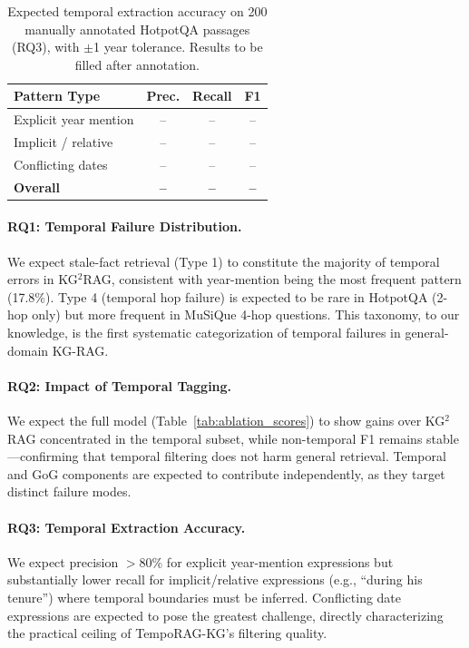 \documentclass[11pt]{article}
\begin{document}
\begin{table}[t]
  \centering
  \small
  \begin{tabular}{lccc}
    \toprule
    \textbf{Pattern Type} & \textbf{Prec.} & \textbf{Recall} & \textbf{F1} \\
    \midrule
    Explicit year mention & -- & -- & -- \\
    Implicit / relative   & -- & -- & -- \\
    Conflicting dates     & -- & -- & -- \\
    \midrule
    \textbf{Overall}      & \textbf{--} & \textbf{--} & \textbf{--} \\
    \bottomrule
  \end{tabular}
  \caption{Expected temporal extraction accuracy on 200 manually
  annotated HotpotQA passages (RQ3), with $\pm$1 year tolerance.
  Results to be filled after annotation.}
  \label{tab:extraction}
\end{table}

\paragraph{RQ1: Temporal Failure Distribution.}
We expect stale-fact retrieval (Type 1) to constitute the majority of
temporal errors in KG$^2$RAG, consistent with year-mention being the most
frequent pattern (17.8\%). Type 4 (temporal hop failure) is expected to be
rare in HotpotQA (2-hop only) but more frequent in MuSiQue 4-hop questions.
This taxonomy, to our knowledge, is the first systematic categorization of
temporal failures in general-domain KG-RAG.

\paragraph{RQ2: Impact of Temporal Tagging.}
We expect the full model (Table~\ref{tab:ablation_scores}) to show gains
over KG$^2$RAG concentrated in the temporal subset, while non-temporal F1
remains stable---confirming that temporal filtering does not harm general
retrieval. Temporal and GoG components are expected to contribute
independently, as they target distinct failure modes.

\paragraph{RQ3: Temporal Extraction Accuracy.}
We expect precision $>$80\% for explicit year-mention expressions but
substantially lower recall for implicit/relative expressions (e.g.,
``during his tenure'') where temporal boundaries must be inferred.
Conflicting date expressions are expected to pose the greatest challenge,
directly characterizing the practical ceiling of TempoRAG-KG's filtering
quality.
\end{document}
